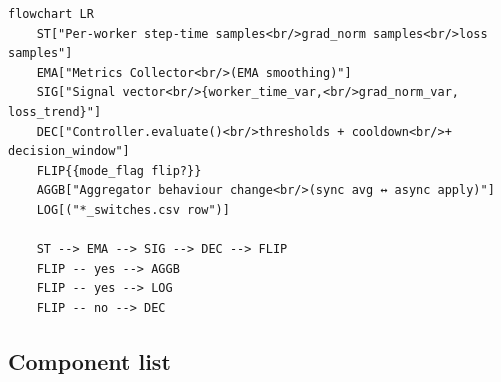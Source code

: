\documentclass[11pt,a4paper]{article}
\begin{document}
\begin{lstlisting}[style=mermaid, caption={Control-signal path (Mermaid)}]
flowchart LR
    ST["Per-worker step-time samples<br/>grad_norm samples<br/>loss samples"]
    EMA["Metrics Collector<br/>(EMA smoothing)"]
    SIG["Signal vector<br/>{worker_time_var,<br/>grad_norm_var, loss_trend}"]
    DEC["Controller.evaluate()<br/>thresholds + cooldown<br/>+ decision_window"]
    FLIP{{mode_flag flip?}}
    AGGB["Aggregator behaviour change<br/>(sync avg ↔ async apply)"]
    LOG[("*_switches.csv row")]

    ST --> EMA --> SIG --> DEC --> FLIP
    FLIP -- yes --> AGGB
    FLIP -- yes --> LOG
    FLIP -- no --> DEC
\end{lstlisting}

\subsection{Component list}
\end{document}
